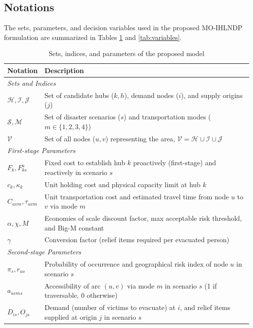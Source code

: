 \subsection{Notations}
The sets, parameters, and decision variables used in the proposed MO-IHLNDP formulation are summarized in Tables \ref{tab:sets_params} and \ref{tab:variables}.

\begin{table}[htbp]
\centering
\caption{Sets, indices, and parameters of the proposed model}
\label{tab:sets_params}
\begin{tabularx}{\textwidth}{p{2cm} X} %
\toprule
\textbf{Notation} & \textbf{Description} \\ \midrule
\multicolumn{2}{l}{\textit{Sets and Indices}} \\
$\mathcal{H}, \mathcal{I}, \mathcal{J}$ & Set of candidate hubs ($k, h$), demand nodes ($i$), and supply origins ($j$) \\
$\mathcal{S}, \mathcal{M}$ & Set of disaster scenarios ($s$) and transportation modes ($m \in \{1,2,3,4\}$) \\
$\mathcal{V}$ & Set of all nodes ($u,v$) representing the area, $\mathcal{V} = \mathcal{H} \cup \mathcal{I} \cup \mathcal{J}$ \\ \midrule
\multicolumn{2}{l}{\textit{First-stage Parameters}} \\
$F_k, F_{ks}^a$ & Fixed cost to establish hub $k$ proactively (first-stage) and reactively in scenario $s$ \\
$c_k, \kappa_k$ & Unit holding cost and physical capacity limit at hub $k$ \\
$C_{uvm}, \tau_{uvm}$ & Unit transportation cost and estimated travel time from node $u$ to $v$ via mode $m$ \\
$\alpha, \chi, M$ & Economies of scale discount factor, max acceptable risk threshold, and Big-M constant \\
$\gamma$ & Conversion factor (relief items required per evacuated person) \\ \midrule
\multicolumn{2}{l}{\textit{Second-stage Parameters}} \\
$\pi_s, r_{us}$ & Probability of occurrence and geographical risk index of node $u$ in scenario $s$ \\
$a_{uvms}$ & Accessibility of arc $(u,v)$ via mode $m$ in scenario $s$ (1 if traversable, 0 otherwise) \\
$D_{is}, O_{js}$ & Demand (number of victims to evacuate) at $i$, and relief items supplied at origin $j$ in scenario $s$ \\

\end{tabularx}
\end{table}
